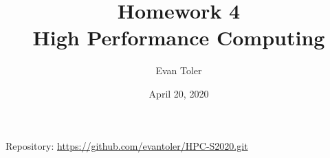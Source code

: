



\author{Evan Toler}
\date{April 20, 2020}
\title{Homework 4 \\ High Performance Computing}


\maketitle



Repository: \url{https://github.com/evantoler/HPC-S2020.git}


